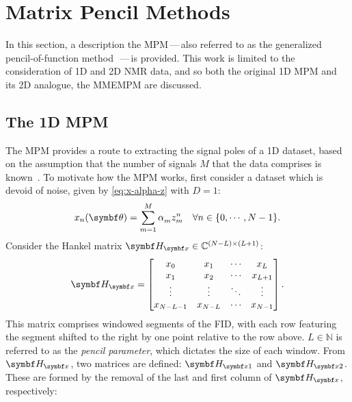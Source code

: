 \section{Matrix Pencil Methods}
\label{sec:mpm}
In this section, a description the \ac{MPM}\,---\,also referred to as the
generalized pencil-of-function method~\cite{Hua1989}\,---\,is provided. This
work is limited to the consideration of \ac{1D} and \ac{2D} \ac{NMR} data, and
so both the original \ac{1D} \ac{MPM} and its \ac{2D} analogue, the \ac{MMEMPM}
are discussed.

\subsection{The 1D MPM}
\label{subsec:mpm}
The \ac{MPM} provides a route to extracting the signal poles of a \ac{1D}
dataset, based on the assumption that the number of signals $M$ that the data
comprises is known~\cite{Hua1990,Hua1990b,Hua1991}.
To motivate how the \ac{MPM} works, first consider a dataset which is devoid of
noise, given by \cref{eq:x-alpha-z} with $D=1$:
\begin{equation}
    x_n(\bth) = \sumM \alpha_m^{\vphantom{n}} z_m^n
    \quad \forall n \in \lbrace 0, \cdots, N-1 \rbrace.
\end{equation}
Consider the Hankel matrix $\Hx \in \mathbb{C}^{(N-L) \times (L+1)}$:
\begin{equation}
    \Hx =
    \begin{bmatrix}
        x_0 & x_1 & \cdots & x_L\\
        x_1 & x_2 & \cdots & x_{L+1}\\
        \vdots & \vdots & \ddots & \vdots\\
        x_{N-L-1} & x_{N-L} & \cdots & x_{N-1}
    \end{bmatrix}.
\end{equation}
This matrix comprises windowed segments of the FID, with each row featuring
the segment shifted to the right by one point relative to the row above.
$L \in \mathbb{N}$ is referred to as the \emph{pencil parameter}, which
dictates the size of each window. From $\Hx$, two matrices are defined:
$\Hxone$ and $\Hxtwo$.  These are formed by the removal of the last and first
column of $\Hx$, respectively:
